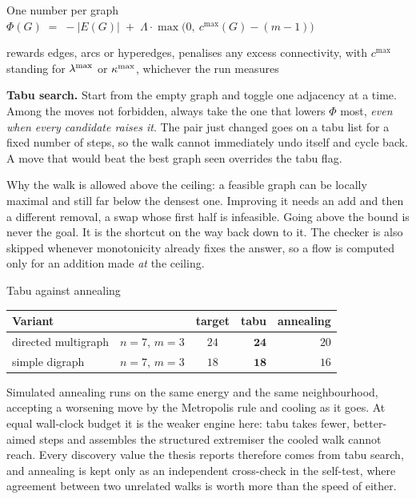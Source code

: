 \documentclass[aspectratio=1610,11pt]{beamer}
\begin{document}
\begin{frame}{One number per graph}
\vfill
\centering
{\color{KULblauw3b}\Large $\displaystyle \Phi(G) \;=\; -|E(G)| \;+\; \Lambda\cdot\max\bigl(0,\ c^{\max}(G)-(m-1)\bigr)$}

\vspace{8pt}
{\footnotesize\color{black!55} rewards edges, arcs or hyperedges, penalises any excess connectivity, with $c^{\max}$ standing for $\lambda^{\max}$ or $\kappa^{\max}$, whichever the run measures}

\vspace{22pt}
\begin{minipage}{0.88\textwidth}
{\small \textbf{Tabu search.} Start from the empty graph and toggle one adjacency at a time. Among the moves not forbidden, always take the one that lowers $\Phi$ most, \emph{even when every candidate raises it}. The pair just changed goes on a tabu list for a fixed number of steps, so the walk cannot immediately undo itself and cycle back. A move that would beat the best graph seen overrides the tabu flag.}

\vspace{12pt}
{\footnotesize\color{black!60} Why the walk is allowed above the ceiling: a feasible graph can be locally maximal and still far below the densest one. Improving it needs an add and then a different removal, a swap whose first half is infeasible. Going above the bound is never the goal. It is the shortcut on the way back down to it. The checker is also skipped whenever monotonicity already fixes the answer, so a flow is computed only for an addition made \emph{at} the ceiling.}
\end{minipage}
\vfill
\end{frame}

\begin{frame}{Tabu against annealing}
\vfill
\centering
\renewcommand{\arraystretch}{1.5}
\small
\begin{tabular}{@{}llcrr@{}}
\toprule
Variant & & target & tabu & annealing \\
\midrule
directed multigraph & $n=7$, $m=3$ & $24$ & $\mathbf{24}$ & $20$ \\
simple digraph      & $n=7$, $m=3$ & $18$ & $\mathbf{18}$ & $16$ \\
\bottomrule
\end{tabular}

\vspace{20pt}
\begin{minipage}{0.88\textwidth}
{\footnotesize\color{black!60} Simulated annealing runs on the same energy and the same neighbourhood, accepting a worsening move by the Metropolis rule and cooling as it goes. At equal wall-clock budget it is the weaker engine here: tabu takes fewer, better-aimed steps and assembles the structured extremiser the cooled walk cannot reach. Every discovery value the thesis reports therefore comes from tabu search, and annealing is kept only as an independent cross-check in the self-test, where agreement between two unrelated walks is worth more than the speed of either.}
\end{minipage}
\vfill
\end{frame}
\end{document}
